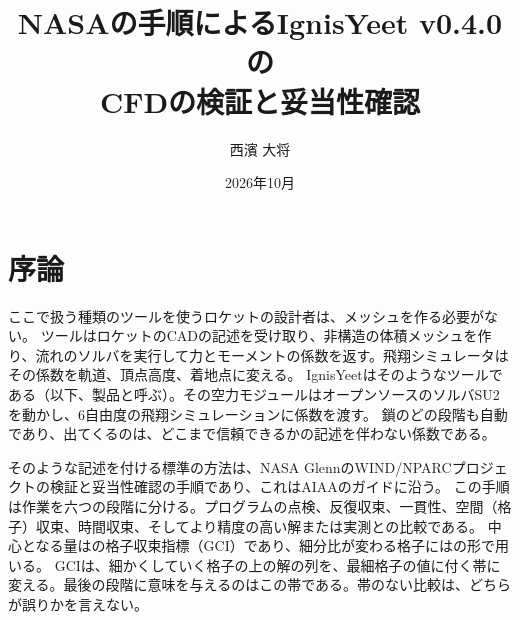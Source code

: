 \documentclass[twocolumn]{labreport}
\title{NASAの手順によるIgnisYeet v0.4.0の\\CFDの検証と妥当性確認}
\author{西濱 大将}
\date{2026年10月}
\begin{document}
\maketitle

\section{序論}
\label{sec:intro}

ここで扱う種類のツールを使うロケットの設計者は、メッシュを作る必要がない。
ツールはロケットのCADの記述を受け取り、非構造の体積メッシュを作り、流れのソルバを実行して力とモーメントの係数を返す。飛翔シミュレータはその係数を軌道、頂点高度、着地点に変える。
IgnisYeetはそのようなツールである（以下、製品と呼ぶ）。その空力モジュールはオープンソースのソルバSU2 \citep{economon2016}を動かし、6自由度の飛翔シミュレーションに係数を渡す。
鎖のどの段階も自動であり、出てくるのは、どこまで信頼できるかの記述を伴わない係数である。

そのような記述を付ける標準の方法は、NASA GlennのWIND/NPARCプロジェクトの検証と妥当性確認の手順\citep{nparc_tutorial}であり、これはAIAAのガイド\citep{aiaa1998}に沿う。
この手順は作業を六つの段階に分ける。プログラムの点検、反復収束、一貫性、空間（格子）収束、時間収束、そしてより精度の高い解または実測との比較である。
中心となる量は\citet{roache1998}の格子収束指標（GCI）であり、細分比が変わる格子には\citet{celik2008}の形で用いる。
GCIは、細かくしていく格子の上の解の列を、最細格子の値に付く帯に変える。最後の段階に意味を与えるのはこの帯である。帯のない比較は、どちらが誤りかを言えない。
\end{document}
